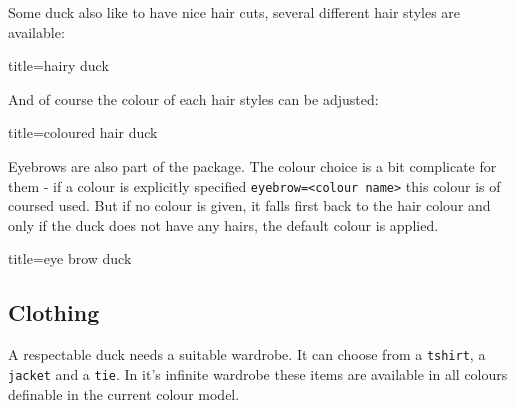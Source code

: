 \documentclass{scrartcl}
\begin{document}
Some duck also like to have nice hair cuts, several different hair styles are available:
\begin{tcblisting}{title={hairy duck}}
\begin{tikzpicture}
	\duck[longhair]
\end{tikzpicture}
\begin{tikzpicture}
	\duck[shorthair]
\end{tikzpicture}

\begin{tikzpicture}
	\duck[crazyhair]
\end{tikzpicture}
\begin{tikzpicture}
	\duck[recedinghair]
\end{tikzpicture}
\end{tcblisting}

And of course the colour of each hair styles can be adjusted:
\begin{tcblisting}{title={coloured hair duck}}
\begin{tikzpicture}
	\duck[longhair=teal]
\end{tikzpicture}
\end{tcblisting}

Eyebrows are also part of the package. The colour choice is a bit complicate for them - if a colour is explicitly specified \verb|eyebrow=<colour name>| this colour is of coursed used. But if no colour is given, it falls first back to the hair colour and only if the duck does not have any hairs, the default colour is applied.
\begin{tcblisting}{title={eye brow duck}}
\begin{tikzpicture}
	\duck[eyebrow]
\end{tikzpicture}
\begin{tikzpicture}
	\duck[longhair=blue, 
		eyebrow]
\end{tikzpicture}

\begin{tikzpicture}
	\duck[crazyhair=red, 
		eyebrow=blue]
\end{tikzpicture}
\end{tcblisting}

\subsection{Clothing}

A respectable duck needs a suitable wardrobe. It can choose from a \texttt{tshirt}, a \texttt{jacket} and a \texttt{tie}. In it's infinite wardrobe these items are available in all colours definable in the current colour model.
\end{document}
